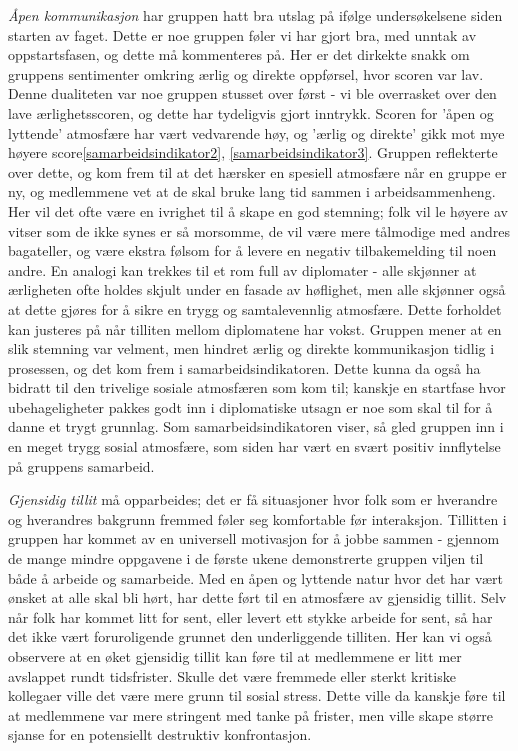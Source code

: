 \emph{Åpen kommunikasjon} har gruppen hatt bra utslag på ifølge undersøkelsene siden starten av faget. Dette er noe gruppen føler vi har gjort bra, med unntak av oppstartsfasen, og dette må kommenteres på. Her er det dirkekte snakk om gruppens sentimenter omkring ærlig og direkte oppførsel, hvor scoren var lav. Denne dualiteten var noe gruppen stusset over først - vi ble overrasket over den lave ærlighetsscoren, og dette har tydeligvis gjort inntrykk. Scoren for 'åpen og lyttende' atmosfære har vært vedvarende høy, og 'ærlig og direkte' gikk mot mye høyere score\ref{samarbeidsindikator2}, \ref{samarbeidsindikator3}.
Gruppen reflekterte over dette, og kom frem til at det hærsker en spesiell atmosfære når en gruppe er ny, og medlemmene vet at de skal bruke lang tid sammen i arbeidsammenheng. Her vil det ofte være en ivrighet til å skape en god stemning; folk vil le høyere av vitser som de ikke synes er så morsomme, de vil være mere tålmodige med andres bagateller, og være ekstra følsom for å levere en negativ tilbakemelding til noen andre. En analogi kan trekkes til et rom full av diplomater - alle skjønner at ærligheten ofte holdes skjult under en fasade av høflighet, men alle skjønner også at dette gjøres for å sikre en trygg og samtalevennlig atmosfære. Dette forholdet kan justeres på når tilliten mellom diplomatene har vokst. Gruppen mener at en slik stemning var velment, men hindret ærlig og direkte kommunikasjon tidlig i prosessen, og det kom frem i samarbeidsindikatoren.
Dette kunna da også ha bidratt til den trivelige sosiale atmosfæren som kom til; kanskje en startfase hvor ubehageligheter pakkes godt inn i diplomatiske utsagn er noe som skal til for å danne et trygt grunnlag. Som samarbeidsindikatoren viser, så gled gruppen inn i en meget trygg sosial atmosfære, som siden har vært en svært positiv innflytelse på gruppens samarbeid.

\emph{Gjensidig tillit} må opparbeides; det er få situasjoner hvor folk som er hverandre og hverandres bakgrunn fremmed føler seg komfortable før interaksjon. Tillitten i gruppen har kommet av en universell motivasjon for å jobbe sammen - gjennom de mange mindre oppgavene i de første ukene demonstrerte gruppen viljen til både å arbeide og samarbeide. Med en åpen og lyttende natur hvor det har vært ønsket at alle skal bli hørt, har dette ført til en atmosfære av gjensidig tillit. Selv når folk har kommet litt for sent, eller levert ett stykke arbeide for sent, så har det ikke vært foruroligende grunnet den underliggende tilliten. Her kan vi også observere at en øket gjensidig tillit kan føre til at medlemmene er litt mer avslappet rundt tidsfrister. Skulle det være fremmede eller sterkt kritiske kollegaer ville det være mere grunn til sosial stress. Dette ville da kanskje føre til at medlemmene var mere stringent med tanke på frister, men ville skape større sjanse for en potensiellt destruktiv konfrontasjon.

